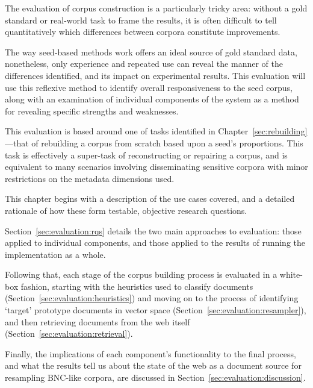 
The evaluation of corpus construction is a particularly tricky area: without a gold standard or real-world task to frame the results, it is often difficult to tell quantitatively which differences between corpora constitute improvements.


The way seed-based methods work offers an ideal source of gold standard data, nonetheless, only experience and repeated use can reveal the manner of the differences identified, and its impact on experimental results.  This evaluation will use this reflexive method to identify overall responsiveness to the seed corpus, along with an examination of individual components of the system as a method for revealing specific strengths and weaknesses.

This evaluation is based around one of tasks identified in Chapter~\ref{sec:rebuilding}---that of rebuilding a corpus from scratch based upon a seed's proportions.  This task is effectively a super-task of reconstructing or repairing a corpus, and is equivalent to many scenarios involving disseminating sensitive corpora with minor restrictions on the metadata dimensions used.



This chapter begins with a description of the use cases covered, and a detailed rationale of how these form testable, objective research questions.

Section~\ref{sec:evaluation:rqs} details the two main approaches to evaluation: those applied to individual components, and those applied to the results of running the implementation as a whole.

Following that, each stage of the corpus building process is evaluated in a white-box fashion, starting with the heuristics used to classify documents (Section~\ref{sec:evaluation:heuristics}) and moving on to the process of identifying `target' prototype documents in vector space (Section~\ref{sec:evaluation:resampler}), and then retrieving documents from the web itself (Section~\ref{sec:evaluation:retrieval}).

Finally, the implications of each component's functionality to the final process, and what the results tell us about the state of the web as a document source for resampling BNC-like corpora, are discussed in Section~\ref{sec:evaluation:discussion}.




